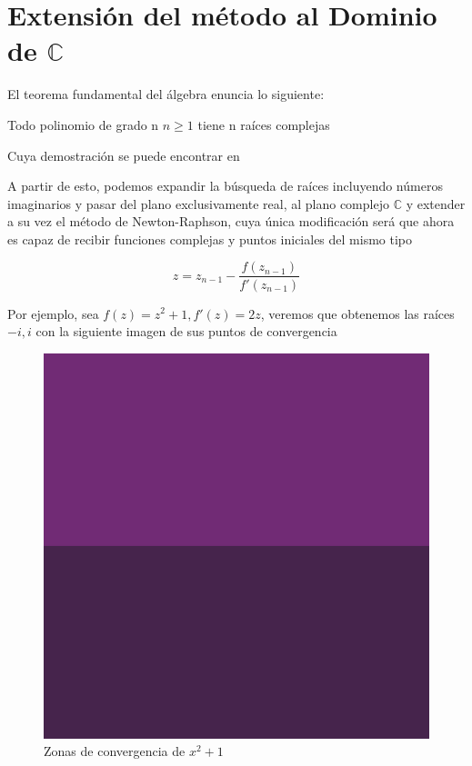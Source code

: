 \section{Extensión del método al Dominio de $\mathbb{C}$}

El teorema fundamental del álgebra enuncia lo siguiente:

\begin{theorem}
 Todo polinomio de grado n $n \geq 1$ tiene n raíces complejas
\end{theorem}

Cuya demostración se puede encontrar en \cite{lankham}

A partir de esto, podemos expandir la búsqueda de raíces incluyendo números imaginarios y pasar del plano exclusivamente real, al plano complejo  $\mathbb{C}$ y extender a su vez el método de Newton-Raphson, cuya única modificación será que ahora es capaz de recibir funciones complejas y puntos iniciales del mismo tipo

\begin{equation}
     z = z_{n-1} - \frac{f(z_{n-1})}{f'(z_{n-1})}
\end{equation}

Por ejemplo, sea $f(z) = z^2+1, f'(z) = 2z$, veremos que obtenemos las  raíces $-i,i$ con la siguiente imagen de sus puntos de convergencia
\begin{figure}[H]
    \centering
    \includegraphics{images/eq3-1.png}
    \caption{ Zonas de convergencia de $ x^2+1$}
    \label{fig:eq_cuad_compleja_1}
\end{figure}

